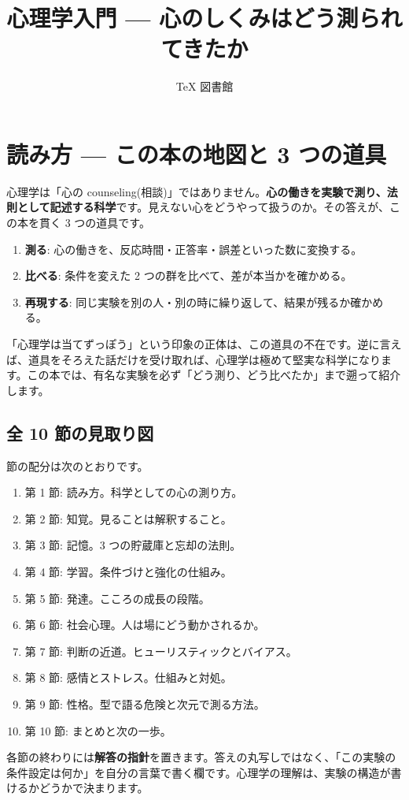 \documentclass{article}
\title{心理学入門 — 心のしくみはどう測られてきたか}
\author{TeX 図書館}
\begin{document}
\section{読み方 — この本の地図と 3 つの道具}

心理学は「心の counseling(相談)」ではありません。\textbf{心の働きを実験で測り、法則として記述する科学}です。見えない心をどうやって扱うのか。その答えが、この本を貫く 3 つの道具です。

\begin{enumerate}
\item \textbf{測る}: 心の働きを、反応時間・正答率・誤差といった数に変換する。
\item \textbf{比べる}: 条件を変えた 2 つの群を比べて、差が本当かを確かめる。
\item \textbf{再現する}: 同じ実験を別の人・別の時に繰り返して、結果が残るか確かめる。
\end{enumerate}

「心理学は当てずっぽう」という印象の正体は、この道具の不在です。逆に言えば、道具をそろえた話だけを受け取れば、心理学は極めて堅実な科学になります。この本では、有名な実験を必ず「どう測り、どう比べたか」まで遡って紹介します。

\subsection{全 10 節の見取り図}

節の配分は次のとおりです。

\begin{enumerate}
\item 第 1 節: 読み方。科学としての心の測り方。
\item 第 2 節: 知覚。見ることは解釈すること。
\item 第 3 節: 記憶。3 つの貯蔵庫と忘却の法則。
\item 第 4 節: 学習。条件づけと強化の仕組み。
\item 第 5 節: 発達。こころの成長の段階。
\item 第 6 節: 社会心理。人は場にどう動かされるか。
\item 第 7 節: 判断の近道。ヒューリスティックとバイアス。
\item 第 8 節: 感情とストレス。仕組みと対処。
\item 第 9 節: 性格。型で語る危険と次元で測る方法。
\item 第 10 節: まとめと次の一歩。
\end{enumerate}

各節の終わりには\textbf{解答の指針}を置きます。答えの丸写しではなく、「この実験の条件設定は何か」を自分の言葉で書く欄です。心理学の理解は、実験の構造が書けるかどうかで決まります。
\end{document}
